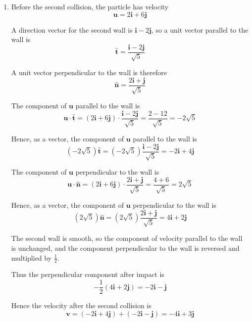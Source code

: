 \documentclass[leqno]{article}
\begin{document}
\begin{enumerate}[
  label=\textbf{\arabic*.},
  leftmargin=*,
  topsep=0pt,
  partopsep=0pt,
  parsep=0pt
]
\begin{djsSolution}
\begin{enumerate}[label=\textbf{(\alph*)}]
After the collision:
\[
\mathbf{v}\cdot \hat{\mathbf{n}}
=(2\mathbf{i}+6\mathbf{j})\cdot \frac{\mathbf{i}-2\mathbf{j}}{\sqrt{5}}
=\frac{2-12}{\sqrt{5}}
=-2\sqrt{5}
\]

The negative sign shows that the perpendicular component has reversed direction after the collision.

The coefficient of restitution is
\[
e=\dfrac{\text{speed of separation perpendicular to the wall}}{\text{speed of approach perpendicular to the wall}}
\]

so
\[
e=\frac{2\sqrt{5}}{3\sqrt{5}}
=\frac{2}{3}
\]


  \item Before the second collision, the particle has velocity
\[
\mathbf{u}=2\mathbf{i}+6\mathbf{j}
\]

A direction vector for the second wall is \(\mathbf{i}-2\mathbf{j}\), so a unit vector parallel to the wall is
\[
\hat{\mathbf{t}}=\frac{\mathbf{i}-2\mathbf{j}}{\sqrt{5}}
\]

A unit vector perpendicular to the wall is therefore
\[
\hat{\mathbf{n}}=\frac{2\mathbf{i}+\mathbf{j}}{\sqrt{5}}
\]

The component of \(\mathbf{u}\) parallel to the wall is
\[
\mathbf{u}\cdot \hat{\mathbf{t}}
=(2\mathbf{i}+6\mathbf{j})\cdot \frac{\mathbf{i}-2\mathbf{j}}{\sqrt{5}}
=\frac{2-12}{\sqrt{5}}
=-2\sqrt{5}
\]

Hence, as a vector, the component of \(\mathbf{u}\) parallel to the wall is
\[
(-2\sqrt{5})\hat{\mathbf{t}}
=(-2\sqrt{5})\frac{\mathbf{i}-2\mathbf{j}}{\sqrt{5}}
=-2\mathbf{i}+4\mathbf{j}
\]

The component of \(\mathbf{u}\) perpendicular to the wall is
\[
\mathbf{u}\cdot \hat{\mathbf{n}}
=(2\mathbf{i}+6\mathbf{j})\cdot \frac{2\mathbf{i}+\mathbf{j}}{\sqrt{5}}
=\frac{4+6}{\sqrt{5}}
=2\sqrt{5}
\]

Hence, as a vector, the component of \(\mathbf{u}\) perpendicular to the wall is
\[
(2\sqrt{5})\hat{\mathbf{n}}
=(2\sqrt{5})\frac{2\mathbf{i}+\mathbf{j}}{\sqrt{5}}
=4\mathbf{i}+2\mathbf{j}
\]

The second wall is smooth, so the component of velocity parallel to the wall is unchanged, and the component perpendicular to the wall is reversed and multiplied by \(\frac12\).

Thus the perpendicular component after impact is
\[
-\frac12(4\mathbf{i}+2\mathbf{j})
=-2\mathbf{i}-\mathbf{j}
\]

Hence the velocity after the second collision is
\[
\mathbf{v}=(-2\mathbf{i}+4\mathbf{j})+(-2\mathbf{i}-\mathbf{j})
=-4\mathbf{i}+3\mathbf{j}
\]


\end{enumerate}
\end{djsSolution}
\end{enumerate}
\end{document}
